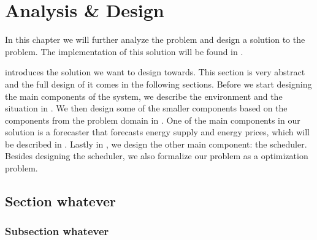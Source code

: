 \chapter{Analysis \& Design}\label{chap:design}\label{chap:analysis}
In this chapter we will further analyze the problem and design a solution to the problem. The implementation of this solution will be found in .

 introduces the solution we want to design towards. This section is very abstract and the full design of it comes in the following sections. Before we start designing the main components of the system, we describe the environment and the situation in . We then design some of the smaller components based on the components from the problem domain in . One of the main components in our solution is a forecaster that forecasts energy supply and energy prices, which will be described in . Lastly in , we design the other main component: the scheduler. Besides designing the scheduler, we also formalize our problem as a optimization problem. 


\section{Section whatever}

\lipsum

\subsection{Subsection whatever}

\lipsum